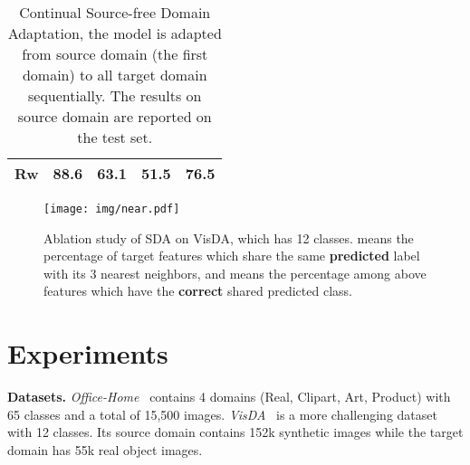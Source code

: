 \documentclass[10pt,twocolumn,letterpaper]{article}
\begin{document}
\begin{table*}[!tbp]
\begin{minipage}[tbp]{0.24\textwidth}
{{\begin{tabular}{|c|c|c|c|c|}
\hline
Rw                & 88.6 & 63.1 & 51.5 & 76.5  \\
\hline
\end{tabular}}}
   \end{minipage}
   \begin{minipage}[tbp]{0.24\textwidth}
\makeatletter 
   \end{minipage}
   \vspace{-2mm}
   \caption{Continual Source-free Domain Adaptation, the model is adapted from source domain (the first domain) to all target domain sequentially. The results on source domain are reported on the test set.\vspace{-4mm}}\label{tab:multi}\vspace{-2mm}
\end{table*}



\begin{figure}[!tbp]
	\centering
	\texttt{[image: img/near.pdf]}
	\vspace{-8mm}
	\caption{Ablation study of SDA on VisDA, which has 12 classes.  means the percentage of target features which share the same \textbf{predicted} label with its 3 nearest neighbors, and  means the percentage among above features which have the \textbf{correct} shared {predicted} class.\vspace{-2mm}}
	\label{fig:neighbor}
	\vspace{-2mm}
\end{figure}


\section{Experiments}
\noindent \textbf{Datasets.} \emph{Office-Home}~\cite{venkateswara2017deep} contains 4 domains (Real, Clipart, Art, Product) with 65 classes and a total of 15,500 images. \emph{VisDA}~\cite{peng2017visda} is a more challenging dataset with 12 classes. Its source domain contains 152k synthetic images while the target domain has 55k real object images. 
\end{document}
